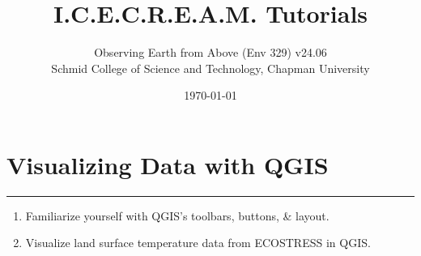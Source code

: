\documentclass[oneside,a4paper,11pt,explicit]{book}
\title{I.C.E.C.R.E.A.M. Tutorials}
\subtitle{\small Observing Earth from Above (Env 329) v24.06  \\
	\small Schmid College of Science and Technology, Chapman University}
\date{\today}
\begin{document}
\setcounter{tocdepth}{3}
\setcounter{minitocdepth}{3}
\dominitoc
\faketableofcontents

\setcounter{chapter}{4} %

\chapter{Visualizing Data with QGIS} %

\vspace{-2em}

\minitoc

\hrule

\vspace{1em}

\begin{tcolorbox}[enhanced,frame style image=blueshade.png,
	opacityback=0.75,opacitybacktitle=0.25,
	colback=blue!5!white,colframe=blue!75!black,title={\Large \textbf{Objectives:}}]
	\large
	\begin{enumerate}
		\item Familiarize yourself with QGIS's toolbars, buttons, \& layout.
		\item Visualize land surface temperature data from ECOSTRESS in QGIS.
	\end{enumerate}
\end{tcolorbox}

\clearpage
\end{document}
